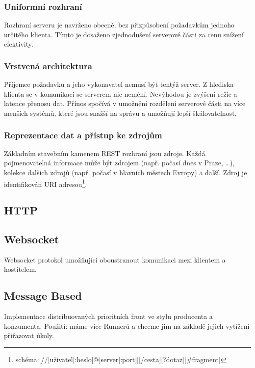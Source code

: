 \subsubsection{Uniformní rozhraní}

Rozhraní serveru je navrženo obecně, bez přizpůsobení požadavkům jednoho určitého klienta.
Tímto je dosaženo zjednodušení serverové části za cenu snížení efektivity. 

\subsubsection{Vrstvená architektura}

Příjemce požadavku a jeho vykonavatel nemusí být tentýž server.
Z hlediska klienta se v komunikaci se serverem nic nemění.
Nevýhodou je zvýšení režie a latence přenosu dat.
Přínos spočívá v umožnění rozdělení serverové části na více menších systémů, které jsou snažší na správu a umožňují lepší škálovatelnost.

\subsubsection{Reprezentace dat a přístup ke zdrojům}

Základním stavebním kamenem REST rozhraní jsou zdroje.
Každá pojmenovatelná informace může být zdrojem (např. počasí dnes v Praze, \ldots), kolekce dalších zdrojů (např. počasí v hlavních městech Evropy) a další.
Zdroj je identifikován URI adresou\footnote{schéma:[//[uživatel[:heslo]@]server[:port]][/cesta][?dotaz][\#fragment]}.





\subsection{HTTP}


\subsection{Websocket}

Websocket protokol umožňující oboustranout komunikaci mezi klientem a hostitelem.







\subsection{Message Based}

Implementace distribuovaných prioritních front ve stylu producenta a konzumenta.
Použití: máme více Runnerů a chceme jim na základě jejich vytížení přiřazovat úkoly.
